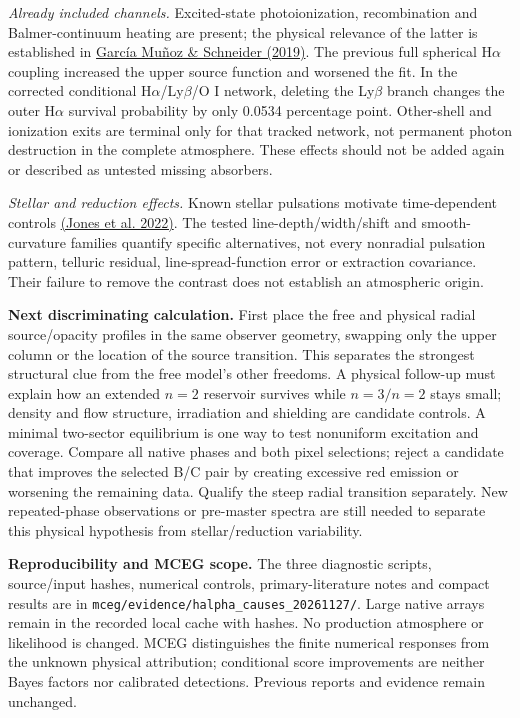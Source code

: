 \documentclass[10pt,a4paper]{article}
\begin{document}
\emph{Already included channels.}
Excited-state photoionization, recombination and Balmer-continuum heating
are present; the physical relevance of the latter is established in
\href{https://arxiv.org/abs/1910.00267}{Garc\'ia Mu\~noz \& Schneider (2019)}.
The previous full spherical H$\alpha$ coupling increased the upper source
function and worsened the fit. In the corrected conditional
H$\alpha$/Ly$\beta$/O I network, deleting the Ly$\beta$ branch changes the
outer H$\alpha$ survival probability by only 0.0534 percentage point.
Other-shell and ionization exits are terminal only for that tracked network,
not permanent photon destruction in the complete atmosphere. These effects should not be
added again or described as untested missing absorbers.

\emph{Stellar and reduction effects.}
Known stellar pulsations motivate time-dependent controls
\href{https://doi.org/10.1051/0004-6361/202243823}{(Jones et al. 2022)}.
The tested line-depth/width/shift and smooth-curvature families quantify
specific alternatives, not every nonradial pulsation pattern, telluric
residual, line-spread-function error or extraction covariance. Their
failure to remove the contrast does not establish an atmospheric origin.

\textbf{Next discriminating calculation.}
First place the free and physical radial source/opacity profiles in the
same observer geometry, swapping only the upper column or the location of
the source transition. This separates the strongest structural clue from
the free model's other freedoms. A physical follow-up must explain how
an extended $n=2$ reservoir survives while $n=3/n=2$ stays small; density
and flow structure, irradiation and shielding are candidate controls.
A minimal two-sector equilibrium is one way to test nonuniform excitation
and coverage. Compare all native phases and both pixel selections; reject a candidate that improves
the selected B/C pair by creating excessive red emission or worsening the
remaining data. Qualify the steep radial transition separately. New
repeated-phase observations or pre-master spectra are still needed to
separate this physical hypothesis from stellar/reduction variability.

\textbf{Reproducibility and MCEG scope.}
The three diagnostic scripts, source/input hashes, numerical controls,
primary-literature notes and compact results are in
\texttt{mceg/evidence/halpha\_causes\_20261127/}.
Large native arrays remain in the recorded local cache with hashes.
No production atmosphere or likelihood is changed. MCEG distinguishes
the finite numerical responses from the unknown physical attribution;
conditional score improvements are neither Bayes factors nor calibrated
detections. Previous reports and evidence remain unchanged.
\end{document}
